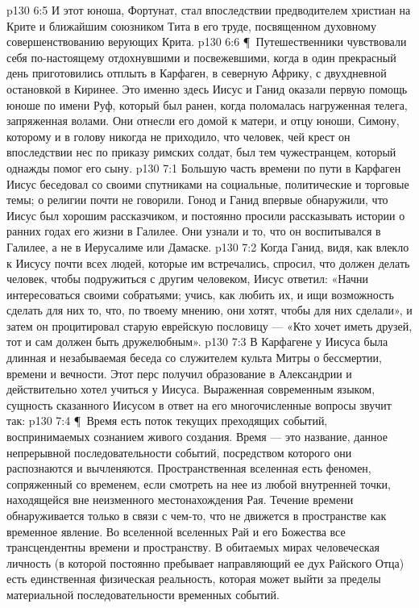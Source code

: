 \vs p130 6:5 И этот юноша, Фортунат, стал впоследствии предводителем христиан на Крите и ближайшим союзником Тита в его труде, посвященном духовному совершенствованию верующих Крита.
\vs p130 6:6 \P\ Путешественники чувствовали себя по\hyp{}настоящему отдохнувшими и посвежевшими, когда в один прекрасный день приготовились отплыть в Карфаген, в северную Африку, с двухдневной остановкой в Киринее. Это именно здесь Иисус и Ганид оказали первую помощь юноше по имени Руф, который был ранен, когда поломалась нагруженная телега, запряженная волами. Они отнесли его домой к матери, и отцу юноши, Симону, которому и в голову никогда не приходило, что человек, чей крест он впоследствии нес по приказу римских солдат, был тем чужестранцем, который однажды помог его сыну.
\vs p130 7:1 Большую часть времени по пути в Карфаген Иисус беседовал со своими спутниками на социальные, политические и торговые темы; о религии почти не говорили. Гонод и Ганид впервые обнаружили, что Иисус был хорошим рассказчиком, и постоянно просили рассказывать истории о ранних годах его жизни в Галилее. Они узнали и то, что он воспитывался в Галилее, а не в Иерусалиме или Дамаске.
\vs p130 7:2 Когда Ганид, видя, как влекло к Иисусу почти всех людей, которые им встречались, спросил, что должен делать человек, чтобы подружиться с другим человеком, Иисус ответил: «Начни интересоваться своими собратьями; учись, как любить их, и ищи возможность сделать для них то, что, по твоему мнению, они хотят, чтобы для них сделали», и затем он процитировал старую еврейскую пословицу --- «Кто хочет иметь друзей, тот и сам должен быть дружелюбным».
\vs p130 7:3 В Карфагене у Иисуса была длинная и незабываемая беседа со служителем культа Митры о бессмертии, времени и вечности. Этот перс получил образование в Александрии и действительно хотел учиться у Иисуса. Выраженная современным языком, сущность сказанного Иисусом в ответ на его многочисленные вопросы звучит так:
\vs p130 7:4 \P\ Время есть поток текущих преходящих событий, воспринимаемых сознанием живого создания. Время --- это название, данное непрерывной последовательности событий, посредством которого они распознаются и вычленяются. Пространственная вселенная есть феномен, сопряженный со временем, если смотреть на нее из любой внутренней точки, находящейся вне неизменного местонахождения Рая. Течение времени обнаруживается только в связи с чем\hyp{}то, что не движется в пространстве как временное явление. Во вселенной вселенных Рай и его Божества все трансцендентны времени и пространству. В обитаемых мирах человеческая личность (в которой постоянно пребывает направляющий ее дух Райского Отца) есть единственная физическая реальность, которая может выйти за пределы материальной последовательности временных событий.
